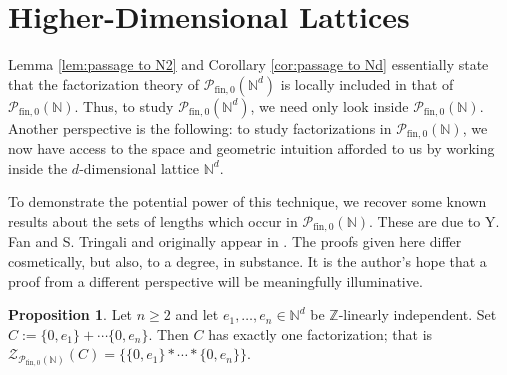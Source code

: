\documentclass{report}
\newcommand{\NN}{\mathbb{N}}
\renewcommand{\P}{\mathcal{P}}
\newcommand{\ZZ}{\mathbb{Z}}
\newcommand{\Z}{\mathcal{Z}}
\newcommand{\fin}{\textrm{fin}}
\newcommand{\fon}{{\textrm{fin}, 0}}
\renewcommand{\:}{\text{:}}
\newcommand{\PN}{{\P_{\fin,0}(\NN)}}
\theoremstyle{definition}
\newtheorem{prop}[defn]{Proposition}
\begin{document}
\section{Higher-Dimensional Lattices}

Lemma \ref{lem:passage to N2} and Corollary \ref{cor:passage to Nd} essentially state that the factorization theory of $\P_\fon(\NN^d)$ is locally included in that of $\PN$.
Thus, to study $\P_\fon(\NN^d)$, we need only look inside $\PN$. 
Another perspective is the following: to study factorizations in $\PN$, we now have access to the space and geometric intuition afforded to us by working inside the $d$-dimensional lattice $\NN^d$.

To demonstrate the potential power of this technique, we recover some known results about the sets of lengths which occur in $\PN$.
These are due to Y. Fan and S. Tringali and originally appear in \cite{fan-tringali18}.
The proofs given here differ cosmetically, but also, to a degree, in substance.
It is the author's hope that a proof from a different perspective will be meaningfully illuminative.





\begin{prop} \label{prop:singleton-length-set}
Let $n\ge 2$ and let $e_1,\dots, e_n\in \NN^d$ be $\ZZ$-linearly independent.
Set $C := \{0,e_1\} + \cdots \{0,e_n\}$.
Then $C$ has exactly one factorization; that is $\Z_{\PN}(C) = \{ \{0,e_1\}*\cdots*\{0,e_n\} \}$.
\end{prop}
\end{document}
